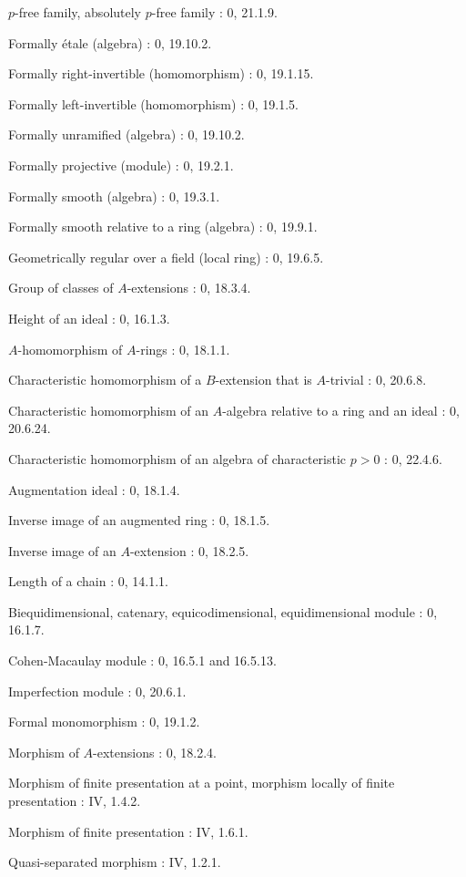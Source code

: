 $p$-free family, absolutely $p$-free family : 0, 21.1.9.\par
Formally étale (algebra) : 0, 19.10.2.\par
Formally right-invertible (homomorphism) : 0, 19.1.15.\par
Formally left-invertible (homomorphism) : 0, 19.1.5.\par
Formally unramified (algebra) : 0, 19.10.2.\par
Formally projective (module) : 0, 19.2.1.\par
Formally smooth (algebra) : 0, 19.3.1.\par
Formally smooth relative to a ring (algebra) : 0, 19.9.1.\par

Geometrically regular over a field (local ring) : 0, 19.6.5.\par
Group of classes of $A$-extensions : 0, 18.3.4.\par

Height of an ideal : 0, 16.1.3.\par
$A$-homomorphism of $A$-rings : 0, 18.1.1.\par
Characteristic homomorphism of a $B$-extension that is $A$-trivial : 0, 20.6.8.\par
Characteristic homomorphism of an $A$-algebra relative to a ring and an ideal : 0, 20.6.24.\par
Characteristic homomorphism of an algebra of characteristic $p>0$ : 0, 22.4.6.\par

Augmentation ideal : 0, 18.1.4.\par
Inverse image of an augmented ring : 0, 18.1.5.\par
Inverse image of an $A$-extension : 0, 18.2.5.\par

Length of a chain : 0, 14.1.1.\par

Biequidimensional, catenary, equicodimensional, equidimensional module : 0, 16.1.7.\par
Cohen-Macaulay module : 0, 16.5.1 and 16.5.13.\par
Imperfection module : 0, 20.6.1.\par
Formal monomorphism : 0, 19.1.2.\par
Morphism of $A$-extensions : 0, 18.2.4.\par
Morphism of finite presentation at a point, morphism locally of finite presentation : IV, 1.4.2.\par
Morphism of finite presentation : IV, 1.6.1.\par
Quasi-separated morphism : IV, 1.2.1.\par

